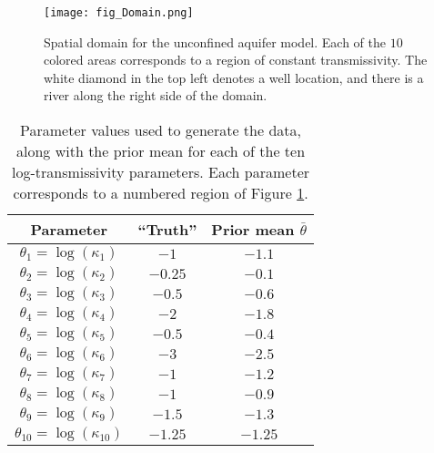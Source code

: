 \begin{figure}[h!]
\centering
    \texttt{[image: fig\_Domain.png]}
    \caption{Spatial domain for the unconfined aquifer model. Each of the $10$ colored areas corresponds to a region of constant transmissivity. The white diamond in the top left denotes a well location, and there is a river along the right side of the domain.}
    \label{fig:tracer-transport-domain}
\end{figure}
\begin{table}[h!]
    \centering
    \begin{tabular}{c|c|c}

        Parameter & ``Truth'' & Prior mean $\bar{\theta}$ 
        \\ \hline \hline
        $\theta_1 = \log{(\kappa_1)}$ & $-1$ & $-1.1$ \\
        $\theta_2 = \log{(\kappa_2)}$ & $-0.25$ & $-0.1$ \\
        $\theta_3 = \log{(\kappa_3)}$ & $-0.5$ & $-0.6$ \\
        $\theta_4 = \log{(\kappa_4)}$ & $-2$ & $-1.8$ \\
        $\theta_5 = \log{(\kappa_5)}$ & $-0.5$ & $-0.4$ \\
        $\theta_6 = \log{(\kappa_6)}$ & $-3$ & $-2.5$  \\
        $\theta_7 = \log{(\kappa_7)}$ & $-1$ & $-1.2$  \\
        $\theta_8 = \log{(\kappa_8)}$ & $-1$ & $-0.9$  \\
        $\theta_9 = \log{(\kappa_9)}$ & $-1.5$ & $-1.3$  \\
        $\theta_{10} = \log{(\kappa_{10})}$ & $-1.25$ & $-1.25$
    \end{tabular}
    \caption{Parameter values used to generate the data, along with the prior mean for each of the ten log-transmissivity parameters. Each parameter corresponds to a numbered region of Figure \ref{fig:tracer-transport-domain}.}
    \label{tab:tracer-log-kappa}
\end{table}


